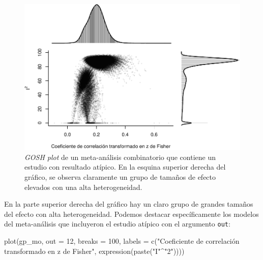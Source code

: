 \documentclass[
  bookmarksnumbered]{article}
\newenvironment{Shaded}{\begin{snugshade}}{\end{snugshade}}
\newcommand{\AttributeTok}[1]{\textcolor[rgb]{0.00,0.34,0.68}{#1}}
\newcommand{\DecValTok}[1]{\textcolor[rgb]{0.69,0.50,0.00}{#1}}
\newcommand{\FunctionTok}[1]{\textcolor[rgb]{0.39,0.29,0.61}{#1}}
\newcommand{\NormalTok}[1]{\textcolor[rgb]{0.12,0.11,0.11}{#1}}
\newcommand{\SpecialCharTok}[1]{\textcolor[rgb]{0.24,0.68,0.91}{#1}}
\newcommand{\StringTok}[1]{\textcolor[rgb]{0.75,0.01,0.01}{#1}}
\begin{document}
\begin{figure}
\centering
\includegraphics{Meta-analysis_files/figure-latex/gosh2-1.pdf}
\caption{\label{fig:gosh2}\emph{GOSH plot} de un meta-análisis combinatorio que contiene un estudio con resultado atípico. En la esquina superior derecha del gráfico, se observa claramente un grupo de tamaños de efecto elevados con una alta heterogeneidad.}
\end{figure}

En la parte superior derecha del gráfico hay un claro grupo de grandes tamaños del efecto con alta heterogeneidad. Podemos destacar específicamente los modelos del meta-análisis que incluyeron el estudio atípico con el argumento \texttt{out}:

\begin{Shaded}
\begin{Highlighting}[]
\FunctionTok{plot}\NormalTok{(gp\_mo, }
     \AttributeTok{out =} \DecValTok{12}\NormalTok{,  }
     \AttributeTok{breaks =} \DecValTok{100}\NormalTok{,}
     \AttributeTok{labels =} \FunctionTok{c}\NormalTok{(}\StringTok{"Coeficiente de correlación transformado en z de Fisher"}\NormalTok{, }
                \FunctionTok{expression}\NormalTok{(}\FunctionTok{paste}\NormalTok{(}\StringTok{"I"}\SpecialCharTok{\^{}}\StringTok{"2"}\NormalTok{))))}
\end{Highlighting}
\end{Shaded}
\end{document}

